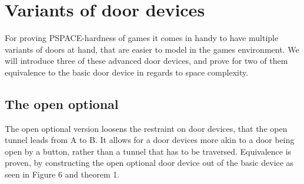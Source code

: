 \documentclass[runningheads]{llncs}
\begin{document}
\section{Variants of door devices}
For proving PSPACE-hardness of games it comes in handy to have multiple variants of doors at hand,
that are easier to model in the games environment. We will introduce three of these advanced door
devices, and prove for two of them equivalence to the basic door device in regards to space
complexity.

\subsection{The open optional}
The open optional version loosens the restraint on door devices, that the open tunnel leads from A
to B. It allows for a door devices more akin to a door being open by a button, rather than a tunnel
that has to be traversed. Equivalence is proven, by constructing the open optional door device out
of the basic device as seen in Figure 6 and theorem 1.
\end{document}
